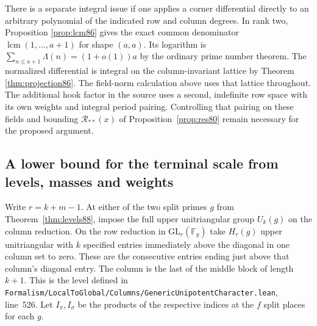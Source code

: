 \documentclass[a4paper,11pt]{article}
\theoremstyle{definition}
\theoremstyle{remark}
\newcommand{\srcloc}[2]{{\small\nolinkurl{#1.lean}}, line~#2}
\numberwithin{equation}{section}
\begin{document}
There is a separate integral issue if one applies a corner
differential directly to an arbitrary polynomial of the indicated
row and column degrees. In rank two, Proposition \ref{prop:lcm86}
gives the exact common denominator \(\operatorname{lcm}(1,\ldots,a+1)\)
for shape \((a,a)\). Its logarithm is
\(\sum_{n\le a+1}\Lambda(n)=(1+o(1))a\) by the ordinary prime
number theorem. The normalized differential is integral on the
column-invariant lattice by Theorem \ref{thm:projection86}. The field-norm
calculation above uses that lattice throughout. The additional
hook factor in the source uses a second, indefinite row space
with its own weights and integral period pairing. Controlling
that pairing on these fields and bounding
\(\mathcal R_{**}(x)\) of Proposition~\ref{prop:res80} remain
necessary for the proposed argument.

\subsection{A lower bound for the terminal scale from levels, masses and weights}\label{nav:VI-21}
Write \(r=k+m-1\). At either of the two split primes \(g\)
from Theorem~\ref{thm:levels88}, impose the full upper
unitriangular group \(U_k(g)\) on the column reduction. On the
row reduction in \(\mathrm{GL}_r(\mathbb F_g)\) take
\(H_r(g)\) upper unitriangular with \(k\) specified entries
immediately above the diagonal in one column set to zero.
These are the consecutive entries ending just above that
column's diagonal entry. The column is the last of the middle
block of length \(k+1\). This is the level defined in
\srcloc{Formalism/LocalToGlobal/Columns/GenericUnipotentCharacter}{526}.
Let \(I_\pi,I_\sigma\) be the products of the respective
indices at the \(f\) split places for each \(g\).
\end{document}
